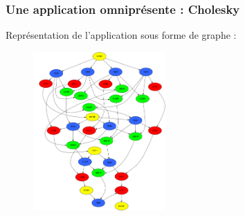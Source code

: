 \documentclass[xcolor={usenames,dvipsnames,svgnames,table}, aspectratio=43]{beamer}
\begin{document}
\begin{frame}
\frametitle{Une application omniprésente : Cholesky}

Représentation de l'application sous forme de graphe :
\begin{figure}
  \includegraphics[width=0.45\textwidth]{graph/cholesky-dag-5.pdf}
\end{figure}


\end{frame}
\end{document}
